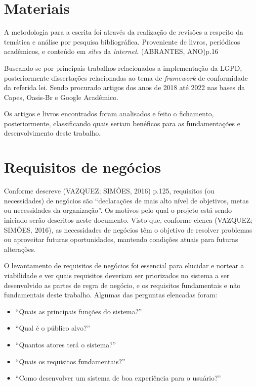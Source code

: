 \documentclass[
	12pt,				%
	openright,			%
	oneside,			%
	a4paper,			%
	english,			%
	french,				%
	spanish,			%
	brazil,				%
	]{abntex2}
\begin{document}
\section{Materiais}

A metodologia para a escrita foi através da realização de revisões a respeito da temática e análise por pesquisa bibliográfica. Proveniente de livros, periódicos acadêmicos, e conteúdo em \textit{sites} da \textit{internet}. (ABRANTES, ANO)p.16

Buscando-se por principais trabalhos relacionados a implementação da LGPD, posteriormente dissertações relacionadas ao tema de \textit{framework}  de conformidade da referida lei. Sendo procurado artigos dos anos de 2018 até 2022 nas bases da Capes, Oasis-Br e Google Acadêmico. 

Os artigos e livros encontrados foram analisados e feito o fichamento, posteriormente, classificando quais seriam benéficos para as fundamentações e desenvolvimento deste trabalho.

\section{Requisitos de negócios}

Conforme descreve (VAZQUEZ; SIMÕES, 2016) p.125, requisitos (ou necessidades) de negócios são “declarações de mais alto nível de objetivos, metas ou necessidades da organização”.  Os motivos pelo qual o projeto está sendo iniciado serão descritos neste documento. Visto que, conforme elenca   (VAZQUEZ; SIMÕES, 2016), as necessidades de negócios têm o objetivo de resolver problemas ou aproveitar futuras oportunidades, mantendo condições atuais para futuras alterações.

O levantamento de requisitos de negócios foi essencial para elucidar e nortear a viabilidade e ver quais requisitos deveriam ser priorizados no sistema a ser desenvolvido as partes de regra de negócio, e os requisitos fundamentais e não fundamentais deste trabalho. Algumas das perguntas elencadas foram:

\begin{itemize}
\item “Quais as principais funções do sistema?”
\item “Qual é o público alvo?”
\item “Quantos atores terá o sistema?”
\item “Quais os requisitos fundamentais?”
\item “Como desenvolver um sistema de boa experiência para o usuário?”
\end{itemize}
\end{document}
